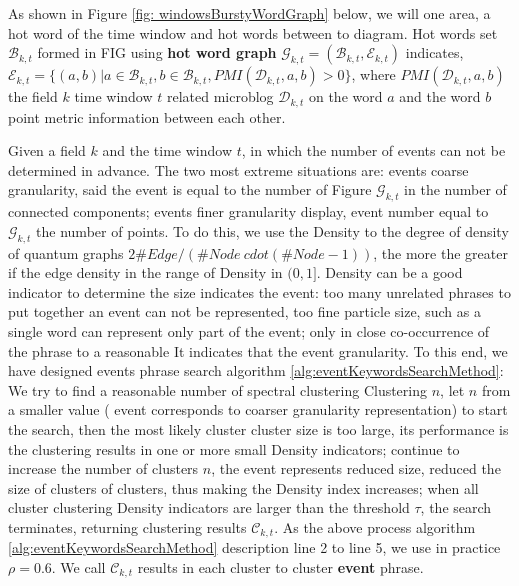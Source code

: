 \documentclass[11pt]{article}
\begin{document}
As shown in Figure \ref{fig: windowsBurstyWordGraph} below, we will one area, a hot word of the time window and hot words between to diagram.
Hot words set \(\mathcal{B}_{k, t} \) formed in FIG using \textbf{hot word graph} \(\mathcal{G}_{k, t} = (\mathcal{B}_{k, t}, \mathcal{E}_{k, t}) \) indicates,
\(\mathcal{E}_{k, t} = \{(a, b) | a \in \mathcal{B}_{k, t}, b \in \mathcal{B}_{k, t }, PMI (\mathcal{D}_{k, t}, a, b)> 0 \} \), where \(PMI (\mathcal{D}_{k, t}, a, b) \) the field \(k \) time window \(t \) related microblog \(\mathcal{D}_{k, t} \) on the word \(a\) and the word \(b\) point metric information between each other.

Given a field \(k\) and the time window \(t\), in which the number of events can not be determined in advance.
The two most extreme situations are: events coarse granularity, said the event is equal to the number of Figure \(\mathcal{G}_{k, t} \) in the number of connected components; events finer granularity display, event number equal to \(\mathcal{G}_{k, t} \) the number of points.
To do this, we use the Density to the degree of density of quantum graphs \(2 \#Edge / (\# Node \ cdot (\# Node-1)) \), the more the greater if the edge density in the range of Density in \((0,1] \).
Density can be a good indicator to determine the size indicates the event: too many unrelated phrases to put together an event can not be represented, too fine particle size, such as a single word can represent only part of the event; only in close co-occurrence of the phrase to a reasonable It indicates that the event granularity.
To this end, we have designed events phrase search algorithm \ref{alg:eventKeywordsSearchMethod}: We try to find a reasonable number of spectral clustering Clustering \(n \), let \(n \) from a smaller value ( event corresponds to coarser granularity representation) to start the search, then the most likely cluster cluster size is too large, its performance is the clustering results in one or more small Density indicators; continue to increase the number of clusters \(n \), the event represents reduced size, reduced the size of clusters of clusters, thus making the Density index increases; when all cluster clustering Density indicators are larger than the threshold \(\tau \), the search terminates, returning clustering results \(\mathcal{C}_{k, t}\).
As the above process algorithm \ref{alg:eventKeywordsSearchMethod} description line 2 to line 5, we use in practice \(\rho = 0.6 \).
We call \(\mathcal{C}_{k, t} \) results in each cluster to cluster \textbf{event} phrase.
\end{document}
